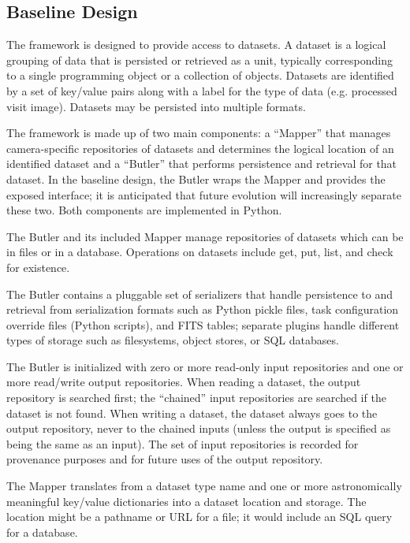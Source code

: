 \documentclass[DM,toc]{lsstdoc}
\begin{document}
\subsection{Baseline Design}\label{butler-design}

The framework is designed to provide access to datasets. A dataset is a logical
grouping of data that is persisted or retrieved as a unit, typically
corresponding to a single programming object or a collection of objects.
Datasets are identified by a set of key/value pairs along with a label for the
type of data (e.g. processed visit image).  Datasets may be persisted into
multiple formats.

The framework is made up of two main components: a ``Mapper'' that manages
camera-specific repositories of datasets and determines the
logical location of an identified dataset and a ``Butler'' that performs
persistence and retrieval for that dataset.  In the baseline design, the Butler
wraps the Mapper and provides the exposed interface; it is anticipated that
future evolution will increasingly separate these two.  Both components are
implemented in Python.

The Butler and its included Mapper manage repositories
of datasets which can be in files or in a database.
Operations on datasets include get, put, list, and check for existence.

The Butler contains a pluggable set of serializers that handle persistence to
and retrieval from serialization formats such as Python pickle files, task
configuration override files (Python scripts), and FITS tables; separate
plugins handle different types of storage such as filesystems, object stores,
or SQL databases.

The Butler is initialized with zero or more read-only input repositories and
one or more read/write output repositories. When reading a dataset, the output
repository is searched first; the ``chained'' input repositories are searched
if the dataset is not found. When writing a dataset, the dataset always goes to
the output repository, never to the chained inputs (unless the output is
specified as being the same as an input).  The set of input repositories is
recorded for provenance purposes and for future uses of the output repository.

The Mapper translates from a dataset type name and one or more
astronomically meaningful key/value dictionaries into a dataset location
and storage. The location might be a pathname or URL for a file; it
would include an SQL query for a database.
\end{document}
